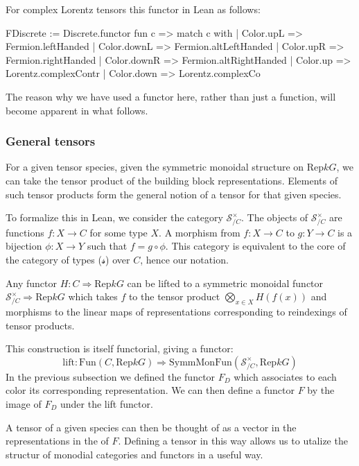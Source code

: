 \documentclass[a4paper, 11pt]{article}
\begin{document}
For complex Lorentz tensors this functor in Lean as follows:
\begin{code}
FDiscrete := Discrete.functor fun c =>
  match c with
  | Color.upL => Fermion.leftHanded
  | Color.downL => Fermion.altLeftHanded
  | Color.upR => Fermion.rightHanded
  | Color.downR => Fermion.altRightHanded
  | Color.up => Lorentz.complexContr
  | Color.down => Lorentz.complexCo
\end{code}

The reason why we have used a functor here, rather than just a function, will become apparent
in what follows.


\subsubsection{General tensors} \label{sec:generalTensors}

For a given tensor species, given the symmetric monoidal structure on $\mathrm{Rep} k G$, 
we can take the tensor product of the building block representations. 
Elements of such tensor products form the general notion of a tensor for that given 
species. 

To formalize this in Lean, we consider the category  $\mathcal{S}_{/C}^\times$. The objects 
of $\mathcal{S}_{/C}^\times$ are functions $f : X \to C$  for some type $X$. 
A morphism from $f : X \to C$ to $g : Y \to C$ is a bijection $\phi : X \to Y$ such that 
$f = g \circ \phi$. 
This category is equivalent to the core of the category of types ($\mathcal{s}$) over $C$, hence 
our notation. 

Any functor $H : C \Rightarrow \mathrm{Rep} k G$ can be lifted to a symmetric monoidal 
functor $\mathcal{S}_{/C}^\times \Rightarrow \mathrm{Rep} k G$ which takes $f$ to the 
tensor product $\bigotimes_{x \in X} H(f(x))$ and morphisms to the linear maps 
of representations corresponding to reindexings of
tensor products.

This construction is itself functorial, 
giving a functor: 
\begin{equation}
  \mathrm{lift} : \mathrm{Fun}(C, \mathrm{Rep} k G) \Rightarrow
  \mathrm{SymmMonFun}(\mathcal{S}_{/C}^\times, \mathrm{Rep} k G)
\end{equation} 
In the previous subsection we defined the functor $F_{D}$ which associates to each color 
its corresponding representation. We can then define a functor $F$ by the image of $F_{D}$ under
the lift functor. 

A tensor of a given species can then be thought of as a vector in the representations in the of $F$.
Defining a tensor in this way allows us to utalize the 
structur of monodial categories and functors in a useful way. 
\end{document}
